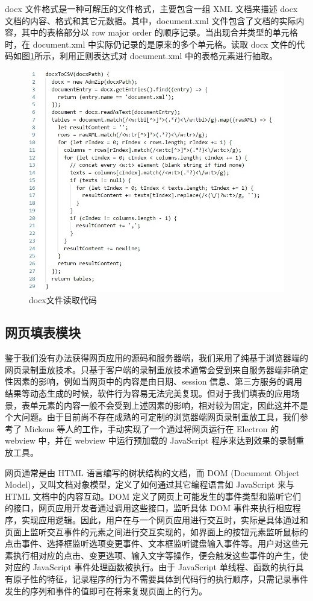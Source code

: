 \documentclass[design, pageheader]{njubachelor}
\begin{document}
docx 文件格式是一种可解压的文件格式，主要包含一组 XML 文档来描述 docx 文档的内容、格式和其它元数据。其中，document.xml 文件包含了文档的实际内容，其中的表格部分以 row major order 的顺序记录。当出现合并类型的单元格时，在 document.xml 中实际仍记录的是原来的多个单元格。读取 docx 文件的代码如图\ref{fig:docx}所示，利用正则表达式对 document.xml 中的表格元素进行抽取。\\
\begin{figure}
    \centering
    \includegraphics[width=15cm,keepaspectratio]{figures/docx.jpg}
    \caption{docx文件读取代码}
    \label{fig:docx}
\end{figure}

\subsection{网页填表模块}
鉴于我们没有办法获得网页应用的源码和服务器端，我们采用了纯基于浏览器端的网页录制重放技术。只基于客户端的录制重放技术通常会受到来自服务器端非确定性因素的影响，例如当网页中的内容是由日期、session 信息、第三方服务的调用结果等动态生成的时候，软件行为容易无法完美复现。但对于我们填表的应用场景，表单元素的内容一般不会受到上述因素的影响，相对较为固定，因此这并不是个大问题。由于目前尚不存在成熟的可定制的浏览器端网页录制重放工具，我们参考了 Mickens 等人的工作\cite{mickens10}，手动实现了一个通过将网页运行在 Electron 的 webview 中，并在 webview 中运行预加载的 JavaScript 程序来达到效果的录制重放工具。

网页通常是由 HTML 语言编写的树状结构的文档，而 DOM (Document Object Model)，又叫文档对象模型，定义了如何通过其它编程语言如 JavaScript 来与 HTML 文档中的内容互动。DOM 定义了网页上可能发生的事件类型和监听它们的接口，网页应用开发者通过调用这些接口，监听具体 DOM 事件来执行相应程序，实现应用逻辑。因此，用户在与一个网页应用进行交互时，实际是具体通过和页面上监听交互事件的元素之间进行交互实现的，如界面上的按钮元素监听鼠标的点击事件、选择框监听选项变更事件、文本框监听键盘输入事件等。用户对这些元素执行相对应的点击、变更选项、输入文字等操作，便会触发这些事件的产生，使对应的 JavaScript 事件处理函数被执行。由于 JavaScript 单线程、函数的执行具有原子性的特征，记录程序的行为不需要具体到代码行的执行顺序，只需记录事件发生的序列和事件的值即可在将来复现页面上的行为。
\end{document}
